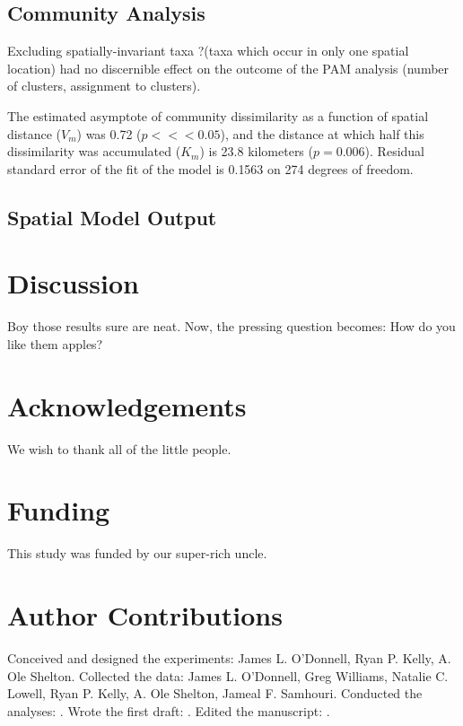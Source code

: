\documentclass[11pt,letterpaper]{article} %
\begin{document}
\subsection*{Community Analysis}
Excluding spatially-invariant taxa ?(taxa which occur in only one spatial location) had no discernible effect on the outcome of the PAM analysis (number of clusters, assignment to clusters).

The estimated asymptote of community dissimilarity as a function of spatial distance ($V_m$) was 0.72 ($p <<< 0.05$), and the distance at which half this dissimilarity was accumulated ($K_m$) is 23.8 kilometers ($p = 0.006$).
Residual standard error of the fit of the model is 0.1563 on 274 degrees of freedom.


\subsection*{Spatial Model Output}


\section*{Discussion}
Boy those results sure are neat. Now, the pressing question becomes: How do you like them apples?

\section*{Acknowledgements}
We wish to thank all of the little people.

\section*{Funding}
This study was funded by our super-rich uncle.

\section*{Author Contributions}
Conceived and designed the experiments: James L. O'Donnell, Ryan P. Kelly, A. Ole Shelton.
Collected the data: James L. O'Donnell, Greg Williams, Natalie C. Lowell, Ryan P. Kelly, A. Ole Shelton, Jameal F. Samhouri.
Conducted the analyses: .
Wrote the first draft: .
Edited the manuscript: .
\end{document}
